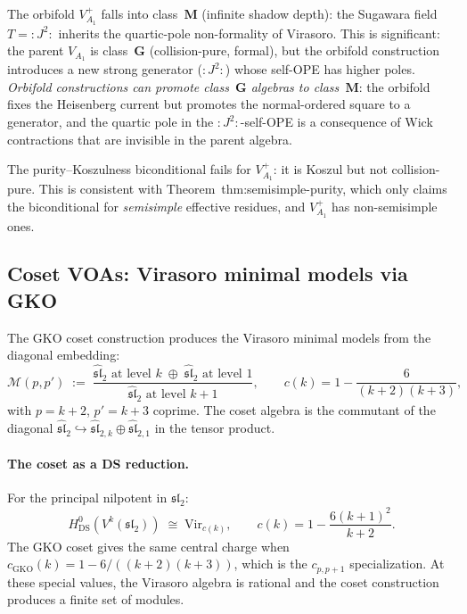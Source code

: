 \documentclass[11pt]{article}
\newcommand{\fsl}{\mathfrak{sl}}
\begin{document}
\begin{remark}
The orbifold $V_{A_1}^{+}$ falls into class~$\mathbf{M}$
(infinite shadow depth): the Sugawara field $T = :J^2:$
inherits the quartic-pole non-formality of Virasoro.
This is significant: the parent $V_{A_1}$ is class~$\mathbf{G}$
(collision-pure, formal), but the orbifold construction
introduces a new strong generator ($:J^2:$) whose self-OPE
has higher poles.  \emph{Orbifold constructions can promote
class~$\mathbf{G}$ algebras to class~$\mathbf{M}$}: the
orbifold fixes the Heisenberg current but promotes the
normal-ordered square to a generator, and the quartic pole
in the $:J^2:$-self-OPE is a consequence of Wick contractions
that are invisible in the parent algebra.

The purity--Koszulness biconditional fails for
$V_{A_1}^{+}$: it is Koszul but not collision-pure.
This is consistent with Theorem~thm:semisimple-purity,
which only claims the biconditional for
\emph{semisimple} effective residues, and
$V_{A_1}^{+}$ has non-semisimple ones.
\end{remark}

\subsection{Coset VOAs: Virasoro minimal models via GKO}
\label{subsec:coset-purity}

The GKO coset construction produces the Virasoro minimal
models from the diagonal embedding:
\[
\mathcal{M}(p,p') \;:=\;
\frac{\widehat{\fsl}_2 \text{ at level } k
  \;\oplus\;
  \widehat{\fsl}_2 \text{ at level } 1}
{\widehat{\fsl}_2 \text{ at level } k{+}1},
\qquad
c(k) = 1 - \frac{6}{(k+2)(k+3)},
\]
with $p = k+2$, $p' = k+3$ coprime.  The coset algebra
is the commutant of the diagonal
$\widehat{\fsl}_2 \hookrightarrow
\widehat{\fsl}_{2,k} \oplus
\widehat{\fsl}_{2,1}$ in the tensor product.

\paragraph{The coset as a DS reduction.}
For the principal nilpotent in $\fsl_2$:
\[
H^0_{\mathrm{DS}}(V^k(\fsl_2))
\;\cong\;
\mathrm{Vir}_{c(k)},
\qquad
c(k) = 1 - \frac{6(k+1)^2}{k+2}.
\]
The GKO coset gives the same central charge when
$c_{\mathrm{GKO}}(k) = 1 - 6/((k+2)(k+3))$,
which is the $c_{p,p+1}$ specialization.  At these
special values, the Virasoro algebra is rational and the
coset construction produces a finite set of modules.
\end{document}
